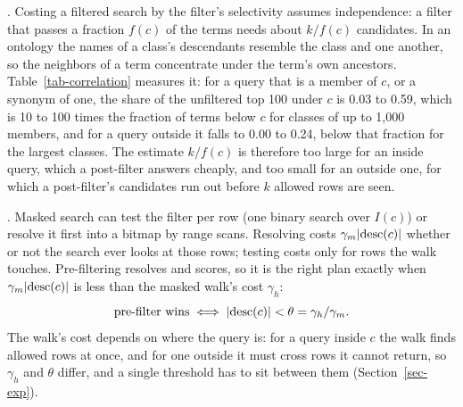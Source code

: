 .
Costing a filtered search by the filter's selectivity assumes independence: a filter
that passes a fraction $f(c)$ of the terms needs about $k/f(c)$ candidates.
In an ontology the names of a class's descendants resemble the class and one
another, so the neighbors of a term concentrate under the term's own ancestors.
Table~\ref{tab-correlation} measures it: for a query that is a member of $c$, or a synonym
of one, the share of the unfiltered top 100 under $c$ is 0.03 to 0.59, which is 10 to 100
times the fraction of terms below $c$ for classes of up to 1,000 members, and for a
query outside it falls to 0.00 to 0.24, below that fraction for the largest classes.
The estimate $k/f(c)$ is therefore too large for an inside query, which a post-filter
answers cheaply, and too small for an outside one, for which a post-filter's
candidates run out before $k$ allowed rows are seen.



.
Masked search can test the filter per row (one binary search over $I(c)$) or resolve it
first into a bitmap by range scans.
Resolving costs $\gamma_m|\mathrm{desc}(c)|$ whether or not the search ever looks at those
rows; testing costs only for rows the walk touches.
Pre-filtering resolves and scores, so it is the right plan exactly when
$\gamma_m|\mathrm{desc}(c)|$ is less than the masked walk's cost $\gamma_h$:
\[
\mathrm{pre\text{-}filter\ wins} \iff |\mathrm{desc}(c)| < \theta = \gamma_h/\gamma_m .
\]
The walk's cost depends on where the query is: for a query inside $c$ the walk finds
allowed rows at once, and for one outside it must cross rows it cannot return, so
$\gamma_h$ and $\theta$ differ, and a single threshold has to sit between them
(Section~\ref{sec-exp}).
